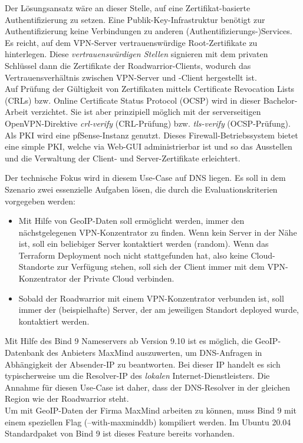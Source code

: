 Der Lösungsansatz wäre an dieser Stelle, auf eine Zertifikat-basierte Authentifizierung zu setzen. Eine Publik-Key-Infrastruktur benötigt zur Authentifizierung keine Verbindungen zu anderen (Authentifizierungs-)Services. Es reicht, auf dem VPN-Server vertrauenswürdige Root-Zertifikate zu hinterlegen. Diese \textit{vertrauenswürdigen Stellen} signieren mit dem privaten Schlüssel dann die Zertifikate der Roadwarrior-Clients, wodurch das Vertrauensverhältnis zwischen VPN-Server und -Client hergestellt ist.\\
Auf Prüfung der Gültigkeit von Zertifikaten mittels Certificate Revocation Lists (CRLs) bzw. Online Certificate Status Protocol (OCSP) wird in dieser Bachelor-Arbeit verzichtet. Sie ist aber prinzipiell möglich mit der serverseitigen OpenVPN-Direktive \textit{crl-verify} (CRL-Prüfung) bzw. \textit{tls-verify} (OCSP-Prüfung).\cite[S.116, S.325-327]{Keijser2011}\\
Als PKI wird eine pfSense-Instanz genutzt. Dieses Firewall-Betriebssystem bietet eine simple PKI, welche via Web-GUI administrierbar ist und so das Ausstellen und die Verwaltung der Client- und Server-Zertifikate erleichtert.\cite[S.376-383]{Netgate2020}

Der technische Fokus wird in diesem Use-Case auf DNS liegen. Es soll in dem Szenario zwei essenzielle Aufgaben lösen, die durch die Evaluationskriterien vorgegeben werden:
\begin{itemize}
\item Mit Hilfe von GeoIP-Daten soll ermöglicht werden, immer den nächstgelegenen VPN-Konzentrator zu finden. Wenn kein Server in der Nähe ist, soll ein beliebiger Server kontaktiert werden (random). Wenn das Terraform Deployment noch nicht stattgefunden hat, also keine Cloud-Standorte zur Verfügung stehen, soll sich der Client immer mit dem VPN-Konzentrator der Private Cloud verbinden.
\item Sobald der Roadwarrior mit einem VPN-Konzentrator verbunden ist, soll immer der (beispielhafte) Server, der am jeweiligen Standort deployed wurde, kontaktiert werden.
\end{itemize}

Mit Hilfe des Bind 9 Nameservers ab Version 9.10 ist es möglich, die GeoIP-Datenbank des Anbieters MaxMind auszuwerten, um DNS-Anfragen in Abhängigkeit der Absender-IP zu beantworten. Bei dieser IP handelt es sich typischerweise um die Resolver-IP des \textit{lokalen} Internet-Dienstleisters. Die Annahme für diesen Use-Case ist daher, dass der DNS-Resolver in der gleichen Region wie der Roadwarrior steht.\\
Um mit GeoIP-Daten der Firma MaxMind arbeiten zu können, muss Bind 9 mit einem speziellen Flag (--with-maxminddb) kompiliert werden. Im Ubuntu 20.04 Standardpaket von Bind 9 ist dieses Feature bereits vorhanden.

